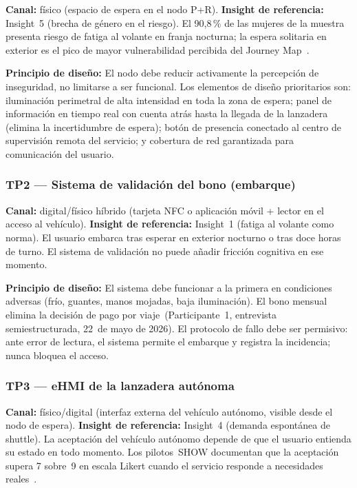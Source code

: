 \textbf{Canal:} físico (espacio de espera en el nodo P+R).
\textbf{Insight de referencia:} Insight~5 (brecha de género en el
riesgo). El 90,8\,\% de las mujeres de la muestra presenta riesgo
de fatiga al volante en franja nocturna; la espera solitaria en
exterior es el pico de mayor vulnerabilidad percibida del Journey
Map~\parencite{LouridoRegueira2026}.

\textbf{Principio de diseño:} El nodo debe reducir activamente la
percepción de inseguridad, no limitarse a ser funcional. Los
elementos de diseño prioritarios son: iluminación perimetral de
alta intensidad en toda la zona de espera; panel de información
en tiempo real con cuenta atrás hasta la llegada de la lanzadera
(elimina la incertidumbre de espera); botón de presencia conectado
al centro de supervisión remota del servicio; y cobertura de red
garantizada para comunicación del usuario.

\subsubsection{TP2 — Sistema de validación del bono (embarque)}
\label{sec:tp2}

\textbf{Canal:} digital/físico híbrido (tarjeta NFC o aplicación
móvil + lector en el acceso al vehículo).
\textbf{Insight de referencia:} Insight~1 (fatiga al volante como
norma). El usuario embarca tras esperar en exterior nocturno o
tras doce horas de turno. El sistema de validación no puede
añadir fricción cognitiva en ese momento.

\textbf{Principio de diseño:} El sistema debe funcionar a la
primera en condiciones adversas (frío, guantes, manos mojadas,
baja iluminación). El bono mensual elimina la decisión de pago
por viaje~(Participante~1, entrevista semiestructurada, 22~de mayo
de 2026). El protocolo de fallo debe ser permisivo: ante error
de lectura, el sistema permite el embarque y registra la
incidencia; nunca bloquea el acceso.

\subsubsection{TP3 — eHMI de la lanzadera autónoma}
\label{sec:tp3}

\textbf{Canal:} físico/digital (interfaz externa del vehículo
autónomo, visible desde el nodo de espera).
\textbf{Insight de referencia:} Insight~4 (demanda espontánea de
shuttle). La aceptación del vehículo autónomo depende de que el
usuario entienda su estado en todo momento. Los pilotos~SHOW
documentan que la aceptación supera 7 sobre~9 en escala
Likert cuando el servicio responde a necesidades
reales~\parencite{SHOW2024Legacy}.

